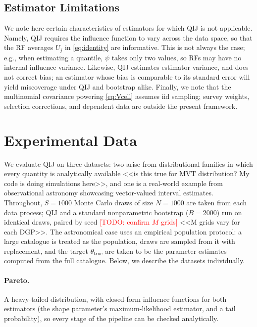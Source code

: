 \documentclass[runningheads]{llncs}
\newcommand{\todo}[1]{\textcolor{red}{[TODO: #1]}}
\newcommand{\ifl}{\psi}
\begin{document}
\subsection{Estimator Limitations}\label{sec:scope}

We note here certain characteristics of estimators for which QIJ is not applicable. Namely, QIJ requires the influence function to vary across the data space, so that the RF averages $U_j$ in \eqref{eq:identity} are informative. This is not always the case; e.g., when estimating a quantile, $\ifl$ takes only two values, so RFs may have no internal influence variance. Likewise, QIJ estimates estimator variance, and does not correct bias; an estimator whose bias is comparable to its standard error will yield miscoverage under QIJ and bootstrap alike. Finally, we note that the multinomial covariance powering \eqref{eq:Vcell} assumes iid sampling; survey weights, selection corrections, and dependent data are outside the present framework.


\section{Experimental Data}\label{sec:data}

We evaluate QIJ on three datasets: two arise from distributional families in which every quantity is analytically available <<is this true for MVT distribution? My code is doing simulations here>>, and one is a real-world example from observational astronomy showcasing vector-valued interval estimates. Throughout, $S=1000$ Monte Carlo draws of size $N = 1000$ are taken from each data process; QIJ and a standard nonparametric bootstrap ($B = 2000$) run on identical draws, paired by seed \todo{confirm $M$ grids} <<M grids vary for each DGP>>. The astronomical case uses an empirical population protocol: a large catalogue is treated as the population, draws are sampled from it with replacement, and the target $\theta_{\mathrm{true}}$ are taken to be the parameter estimates computed from the full catalogue. Below, we describe the datasets individually. 

\paragraph{Pareto.} A heavy-tailed distribution, with closed-form influence functions for both estimators (the shape parameter's maximum-likelihood estimator, and a tail probability), so every stage of the pipeline can be checked analytically.
\end{document}

